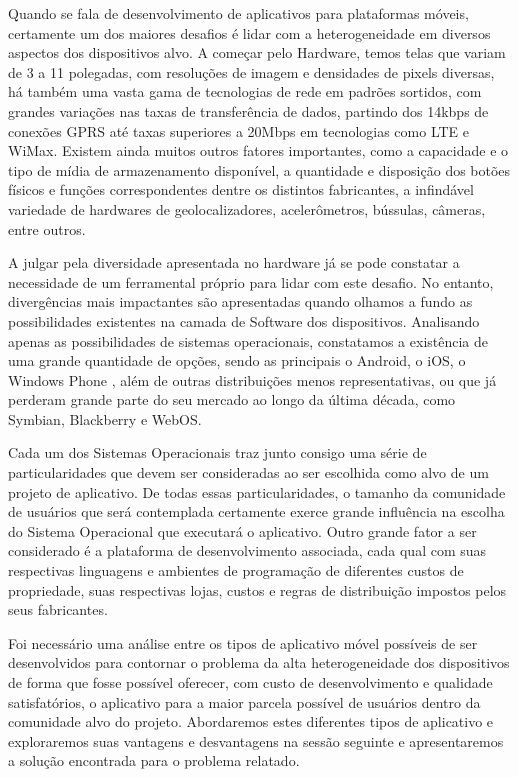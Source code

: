 Quando se fala de desenvolvimento de aplicativos para plataformas móveis, certamente um dos maiores desafios é lidar com a heterogeneidade em diversos aspectos dos dispositivos alvo. A começar pelo Hardware, temos telas que variam de 3 a 11 polegadas, com resoluções de imagem e densidades de pixels diversas, há também uma vasta gama de tecnologias de rede em padrões sortidos, com grandes variações nas taxas de transferência de dados, partindo dos 14kbps de conexões GPRS até  taxas superiores a 20Mbps em tecnologias como LTE e WiMax. Existem ainda muitos outros fatores importantes, como a capacidade e o tipo de mídia de armazenamento disponível, a quantidade e disposição dos botões físicos e funções correspondentes dentre os distintos fabricantes, a infindável variedade de hardwares de geolocalizadores, acelerômetros, bússulas, câmeras, entre outros.

A julgar pela diversidade apresentada no hardware já se pode constatar a necessidade de um ferramental próprio para lidar com este desafio. No entanto, divergências mais impactantes são apresentadas quando olhamos a fundo as possibilidades existentes na camada de Software dos dispositivos.
Analisando apenas as possibilidades de sistemas operacionais, constatamos a existência de uma grande quantidade de opções, sendo as principais o Android, o iOS, o Windows Phone \cite{report:idc}, além de outras distribuições menos representativas, ou que já perderam grande parte do seu mercado ao longo da última década, como Symbian, Blackberry e WebOS. 

Cada um dos Sistemas Operacionais traz junto consigo uma série de particularidades que devem ser consideradas ao ser escolhida como alvo de um projeto de aplicativo.
De todas essas particularidades, o tamanho da comunidade de usuários que será contemplada certamente exerce grande influência na escolha do Sistema Operacional que executará o aplicativo.
Outro grande fator a ser considerado é a plataforma de desenvolvimento associada, cada qual com suas respectivas linguagens e ambientes de programação de diferentes custos de propriedade, suas respectivas lojas, custos e regras de distribuição impostos pelos seus fabricantes.


Foi necessário uma análise entre os tipos de aplicativo móvel possíveis de ser desenvolvidos para contornar o problema da alta heterogeneidade dos dispositivos de forma que fosse possível oferecer, com custo de desenvolvimento e qualidade satisfatórios, o aplicativo para a maior parcela possível de usuários dentro da comunidade alvo do projeto. Abordaremos estes diferentes tipos de aplicativo e exploraremos suas vantagens e desvantagens na sessão seguinte e apresentaremos a solução encontrada para o problema relatado.


